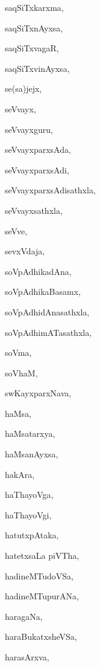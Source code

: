 \begin{multicols}{2}
{saqSiTxkarxma}, \pageref{saqSiTxkarxma}

{saqSiTxnAyxsa}, \pageref{saqSiTxnAyxsa}

{saqSiTxvagaR}, \pageref{saqSiTxvagaR}

{saqSiTxvinAyxsa}, \pageref{saqSiTxvinAyxsa}

{se(sa)jejx}, \pageref{sesajejx}

{seVvayx}, \pageref{seVvayx}

{seVvayxguru}, \pageref{seVvayxguru}

{seVvayxparxsAda}, \pageref{seVvayxparxsAda}

{seVvayxparxsAdi}, \pageref{seVvayxparxsAdi}

{seVvayxparxsAdisathxla}, \pageref{seVvayxparxsAdisathxla}

{seVvayxsathxla}, \pageref{seVvayxsathxla}

{seVve}, \pageref{seVve}

{sevxVdaja}, \pageref{sevxVdaja}

{soVpAdhikadAna}, \pageref{soVpAdhikadAna}

{soVpAdhikaBasamx}, \pageref{soVpAdhikaBasamx}

{soVpAdhidAnasathxla}, \pageref{soVpAdhidAnasathxla}

{soVpAdhimATasathxla}, \pageref{soVpAdhimATasathxla}

{soVma}, \pageref{soVma}

{soVhaM}, \pageref{soVhaM}

{swKayxparxNava}, \pageref{swKayxparxNava}

{haMsa}, \pageref{haMsa}

{haMsatarxya}, \pageref{haMsatarxya}

{haMsanAyxsa}, \pageref{haMsanAyxsa}

{hakAra}, \pageref{hakAra}

{haThayoVga}, \pageref{haThayoVga}

{haThayoVgi}, \pageref{haThayoVgi}

{hatutxpAtaka}, \pageref{hatutxpAtaka}

{hatetxsaLa piVTha}, \pageref{hatetxsaLapiVTha}

{hadineMTudoVSa}, \pageref{hadineMTudoVSa}

{hadineMTupurANa}, \pageref{hadineMTupurANa}

{haragaNa}, \pageref{haragaNa}

{haraBukatxsheVSa}, \pageref{haraBukatxsheVSa}

{harasArxva}, \pageref{harasArxva}


\end{multicols}
